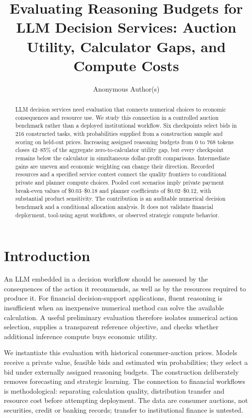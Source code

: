 \documentclass[sigconf,anonymous,nonacm]{acmart}
\title[Reasoning Budgets for LLM Decision Services]{Evaluating Reasoning Budgets for LLM Decision Services: Auction Utility, Calculator Gaps, and Compute Costs}
\author{Anonymous Author(s)}
\begin{document}
\begin{abstract}
LLM decision services need evaluation that connects numerical choices to economic consequences and resource use. We study this connection in a controlled auction benchmark rather than a deployed institutional workflow. Six checkpoints select bids in 216 constructed tasks, with probabilities supplied from a construction sample and scoring on held-out prices. Increasing assigned reasoning budgets from 0 to 768 tokens closes 42--85\% of the aggregate zero-to-calculator utility gap, but every checkpoint remains below the calculator in simultaneous dollar-profit comparisons. Intermediate gains are uneven and economic weighting can change their direction. Recorded resources and a specified service contest connect the quality frontiers to conditional private and planner compute choices. Pooled cost scenarios imply private payment break-even values of \$0.03--\$0.18 and planner coefficients of \$0.02--\$0.12, with substantial product sensitivity. The contribution is an auditable numerical decision benchmark and a conditional allocation analysis. It does not validate financial deployment, tool-using agent workflows, or observed strategic compute behavior.
\end{abstract}
\maketitle
\section{Introduction}
An LLM embedded in a decision workflow should be assessed by the consequences of the action it recommends, as well as by the resources required to produce it. For financial decision-support applications, fluent reasoning is insufficient when an inexpensive numerical method can solve the available calculation. A useful preliminary evaluation therefore isolates numerical action selection, supplies a transparent reference objective, and checks whether additional inference compute buys economic utility.

We instantiate this evaluation with historical consumer-auction prices. Models receive a private value, feasible bids and estimated win probabilities; they select a bid under externally assigned reasoning budgets. The construction deliberately removes forecasting and strategic learning. The connection to financial workflows is methodological: separating calculation quality, distribution transfer and resource cost before attempting deployment. The data are consumer auctions, not securities, credit or banking records; transfer to institutional finance is untested.
\end{document}
